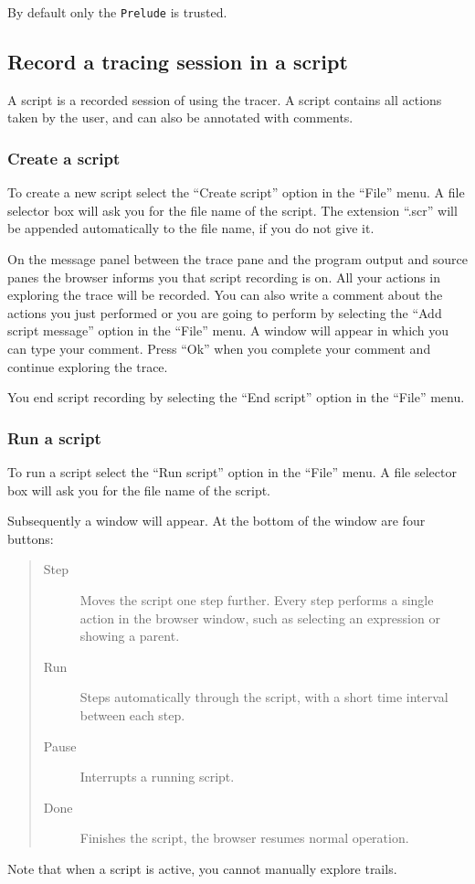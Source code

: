 \documentclass[12pt]{article}
\begin{document}
By default only the \texttt{Prelude} is trusted.



\subsection{Record a tracing session in a script}

A script is a recorded session of using the tracer. A script
contains all actions taken by the user, and can also be annotated
with comments. 

\subsubsection{Create a script}

To create a new script select the ``Create script'' option in the ``File'' menu. A file selector box will ask you for the file name of the script. The extension ``.scr'' will be appended automatically to the file name, if you do not give it.

On the message panel between the trace pane and the program output and source panes the browser informs you that script recording is on. All your actions in exploring the trace will be recorded. You can also write a comment about the actions you just performed or you are going to perform by selecting the ``Add script message'' option in the ``File'' menu. A window will appear in which you can type your comment. Press ``Ok'' when you complete your comment and continue exploring the trace.

You end script recording by selecting the ``End script'' option in the ``File'' menu.

\subsubsection{Run a script}

To run a script select the ``Run script'' option in the ``File'' menu.
A file selector box will ask you for the file name of the script. 

Subsequently a window will appear. At the bottom of the window are four buttons:
\begin{quote}
\begin{description}
\item[Step] Moves the script one step further. Every step performs a single action in the browser window, such as selecting an expression or showing a parent.
\item[Run] Steps automatically through the script, with a short time interval
between each step.
\item[Pause] Interrupts a running script.
\item[Done] Finishes the script, the browser resumes normal operation.
\end{description}
\end{quote}
Note that when a script is active, you cannot manually explore trails.
\end{document}
